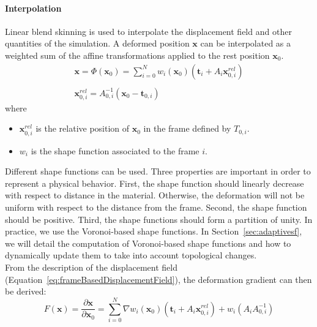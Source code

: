 \paragraph{Interpolation}
Linear blend skinning is used to interpolate the displacement field and other quantities of the simulation. 
A deformed position $\mathbf{x}$ can be interpolated as a weighted sum of the affine transformations applied to the rest position $\mathbf{x}_{0}$.
\begin{equation}
\label{eq:frameBasedDisplacementField}
\begin{array}{l}
\displaystyle \mathbf{x} = \Phi(\mathbf{x}_{0}) = \sum_{i=0}^{N} w_{i}(\mathbf{x}_{0})\left(\mathbf{t}_{i}+A_{i}\mathbf{x}_{0,i}^{rel}\right) \\ \\
\displaystyle \mathbf{x}_{0,i}^{rel} = A_{0,i}^{-1}\left( \mathbf{x}_{0} - \mathbf{t}_{0,i} \right)
\end{array}
\end{equation}
where 
\begin{itemize}
\item $\mathbf{x}_{0,i}^{rel}$ is the relative position of $\mathbf{x}_{0}$ in the frame defined by $T_{0,i}$.
\item $w_{i}$ is the shape function associated to the frame $i$.
\end{itemize}
Different shape functions can be used. Three properties are important in order to represent a physical behavior. 
First, the shape function should linearly decrease with respect to distance in the material. 
Otherwise, the deformation will not be uniform with respect to the distance from the frame. 
Second, the shape function should be positive. 
Third, the shape functions should form a partition of unity. 
In practice, we use the Voronoi-based shape functions.
In Section~\ref{sec:adaptivesf}, we will detail the computation of Voronoi-based shape functions and how to dynamically update them to take into account topological changes.
\\
From the description of the displacement field (Equation~\eqref{eq:frameBasedDisplacementField}), the deformation gradient can then be derived:
\begin{equation}
\displaystyle
F\left(\mathbf{x}\right) = 
\frac{\partial \mathbf{x}}{\partial \mathbf{x}_{0}} =
\sum_{i=0}^{N} \nabla w_{i}(\mathbf{x}_{0}) \left( \mathbf{t}_{i}+A_{i}\mathbf{x}_{0,i}^{rel}\right) + 
w_{i}\left( A_{i}A_{0,i}^{-1} \right)
\end{equation}

